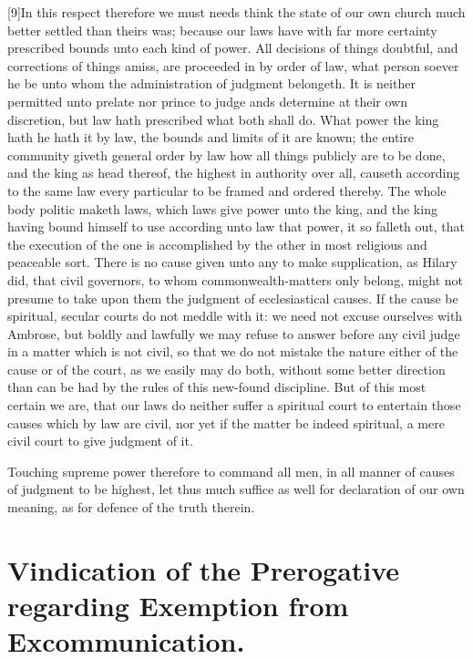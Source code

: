 [9]In this respect therefore we must needs think the state of our own church much better settled than theirs was; because our laws have with far more certainty prescribed bounds unto each kind of power. All decisions of things doubtful, and corrections of things amiss, are proceeded in by order of law, what person soever he be unto whom the administration of judgment belongeth. It is neither permitted unto prelate nor prince to judge ands determine at their own discretion, but law hath prescribed what both shall do. What power the king hath he hath it by law, the bounds and limits of it are known; the entire community giveth general order by law how all things publicly are to be done, and the king as head thereof, the highest in authority over all, causeth according to the same law every particular to be framed and ordered thereby. The whole body politic maketh laws, which laws give power unto the king, and the king having bound himself to use according unto law that power, it so falleth out, that the execution of the one is accomplished by the other in most religious and peaceable sort. There is no cause given unto any to make supplication, as Hilary did, that civil governors, to whom commonwealth-matters only belong, might not presume to take upon them the judgment of ecclesiastical causes. If the cause be spiritual, secular courts do not meddle with it: we need not excuse ourselves with Ambrose, but boldly and lawfully we may refuse to answer before any civil  judge in a matter which is not civil, so that we do not mistake the nature either of the cause or of the court, as we easily may do both, without some better direction than can be had by the rules of this new-found discipline. But of this most certain we are, that our laws do neither suffer a spiritual court to entertain those causes which by law are civil, nor yet if the matter be indeed spiritual, a mere civil court to give judgment of it.

Touching supreme power therefore to command all men, in all manner of causes of judgment to be highest, let thus much suffice as well for declaration of our own meaning, as for defence of the truth therein.


\section*{Vindication of the Prerogative regarding Exemption from Excommunication.}

